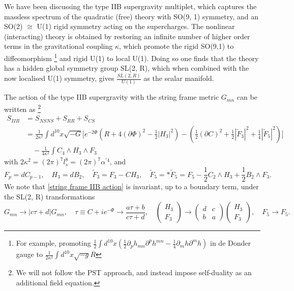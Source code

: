 {\color{orange}
We have been discussing the type IIB supergravity multiplet, which captures the massless spectrum of the quadratic (free) theory with SO(9, 1) symmetry, and an SO(2) $\cong$ U(1) rigid symmetry acting on the supercharges.
The nonlinear (interacting) theory is obtained by restoring an infinite number of higher order terms in the gravitational coupling $\kappa$, which promote the rigid SO(9,1) to diffeomorphism
\footnote{
For example, promoting $\frac{1}{2}\int d^{10}x\left(\frac{1}{2}\partial_p h_{mn}\partial^p h^{mn}-\frac{1}{4}\partial_m h \partial^m h\right)$ in de Donder gauge to $\frac{1}{2\kappa^2}\int d^{10}x\sqrt{-g}R$}
and rigid U(1) to local U(1). Doing so \cite{Green:1982tk,Schwarz:1983wa,Schwarz:1983qr,Howe:1983sra} one finds that the theory has a hidden global symmetry group SL(2, R), which when combined with the now localised U(1) symmetry, gives $\frac{SL(2, R)}{U(1)}$ as the scalar manifold.



The action of the type IIB supergravity \cite{Schwarz:1983qr,Howe:1983sra,Bergshoeff:1995as} with the string frame metric $G_{mn}$ can be written as 
\cite{Becker:2006dvp,ValeixoBento:2025emh}
\footnote{
We will not follow the PST approach, and instead impose self-duality as an additional field equation.
}
\begin{equation}
\begin{aligned}
S_{IIB}
&=S_{NSNS} + S_{RR} + S_{CS}\\
&=\frac{1}{2\kappa^2}
\int d^{10}x \sqrt{-G}
\Bigg[
e^{-2\Phi}\left(R + 4(\partial\Phi)^2-\frac{1}{2}|H_3|^2\right)
-\left(\frac{1}{2}(\partial C)^2+\frac{1}{2}|\tilde F_3|^2+\frac{1}{4}|\tilde{F}_5|^2\right)
\Bigg]\\
&\quad -\frac{1}{4\kappa^2}\int C_4\wedge H_3\wedge F_3
\end{aligned}
\label{string frame IIB action}
\end{equation}
with $2\kappa^2=(2\pi)^7l_s^8=(2\pi)^7\alpha^{\prime 4}$, and
\begin{equation}
F_p = dC_{p-1}, \quad 
H_3 = dB_2, \quad
\tilde F_3 = F_3 - C H_3,\quad
\tilde F_5 = * \tilde F_5 = F_5 - \frac12 C_2\wedge H_3 + \frac12 B_2\wedge F_3.
\end{equation}
We note that \eqref{string frame IIB action} is invariant, up to a boundary term, under the SL(2, R) transformations
\begin{equation}
G_{mn}\to |c\tau+d|G_{mn},\quad
\tau\equiv C + i e^{-\Phi} \to \frac{a\tau+b}{c\tau+d},\quad
\begin{pmatrix}
H_3\\F_3
\end{pmatrix}
\to
\begin{pmatrix}
d&c\\b&a
\end{pmatrix}
\begin{pmatrix}
H_3\\F_3
\end{pmatrix},\quad
F_5 \to F_5.
\label{string frame sl2r transformations}
\end{equation}

}
